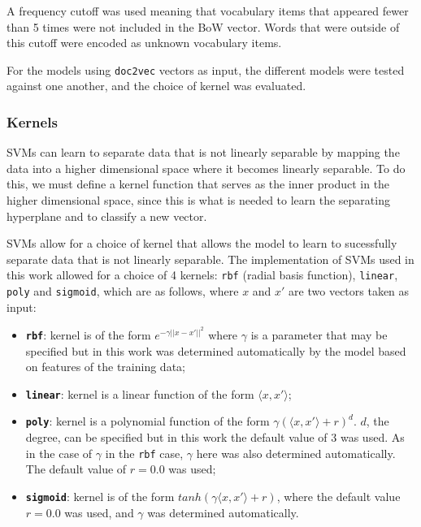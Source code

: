 \documentclass[twocolumn]{article}
\begin{document}
A frequency cutoff was used meaning that vocabulary items that appeared fewer than 5 times were not included in the BoW vector. Words that were outside of this cutoff were encoded as unknown vocabulary items.

For the models using \texttt{doc2vec} vectors as input, the different models were tested against one another, and the choice of kernel was evaluated.

\subsubsection{Kernels}

SVMs can learn to separate data that is not linearly separable by mapping the data into a higher dimensional space where it becomes linearly separable. To do this, we must define a kernel function that serves as the inner product in the higher dimensional space, since this is what is needed to learn the separating hyperplane and to classify a new vector.

SVMs allow for a choice of kernel that allows the model to learn to sucessfully separate data that is not linearly separable. The implementation of SVMs used in this work allowed for a choice of 4 kernels: \texttt{rbf} (radial basis function), \texttt{linear}, \texttt{poly} and \texttt{sigmoid}, which are as follows, where $x$ and $x'$ are two vectors taken as input:

\begin{itemize}
	\item \textbf{\texttt{rbf}}: kernel is of the form $e^{-\gamma||x-x'||^2}$ where $\gamma$ is a parameter that may be specified but in this work was determined automatically by the model based on features of the training data;
	\item \textbf{\texttt{linear}}: kernel is a linear function of the form $\langle x, x' \rangle$;
	\item \textbf{\texttt{poly}}: kernel is a polynomial function of the form $\gamma(\langle x, x' \rangle + r)^d$. $d$, the degree, can be specified but in this work the default value of 3 was used. As in the case of $\gamma$ in the \texttt{rbf} case, $\gamma$ here was also determined automatically. The default value of $r=0.0$ was used;
	\item \textbf{\texttt{sigmoid}}: kernel is of the form $tanh(\gamma \langle x, x' \rangle + r)$, where the default value $r=0.0$ was used, and $\gamma$ was determined automatically.
\end{itemize}
\end{document}
